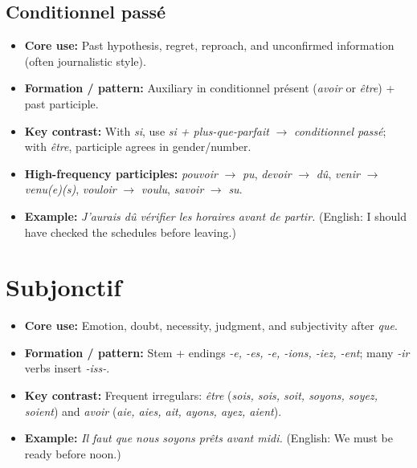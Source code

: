 \documentclass{article}
\begin{document}
\subsection{Conditionnel passé}
\begin{itemize}
    \item \textbf{Core use:} Past hypothesis, regret, reproach, and unconfirmed information (often journalistic style).
    \item \textbf{Formation / pattern:} Auxiliary in conditionnel présent (\textit{avoir} or \textit{être}) + past participle.
    \item \textbf{Key contrast:} With \textit{si}, use \textit{si + plus-que-parfait} $\to$ \textit{conditionnel passé}; with \textit{être}, participle agrees in gender/number.
    \item \textbf{High-frequency participles:} \textit{pouvoir} $\to$ \textit{pu}, \textit{devoir} $\to$ \textit{dû}, \textit{venir} $\to$ \textit{venu(e)(s)}, \textit{vouloir} $\to$ \textit{voulu}, \textit{savoir} $\to$ \textit{su}.
    \item \textbf{Example:} \textit{J'aurais dû vérifier les horaires avant de partir.} (English: I should have checked the schedules before leaving.)
\end{itemize}

\section{Subjonctif}
\begin{itemize}
    \item \textbf{Core use:} Emotion, doubt, necessity, judgment, and subjectivity after \textit{que}.
    \item \textbf{Formation / pattern:} Stem + endings \textit{-e, -es, -e, -ions, -iez, -ent}; many \textit{-ir} verbs insert \textit{-iss-}.
    \item \textbf{Key contrast:} Frequent irregulars: \textit{être} (\textit{sois, sois, soit, soyons, soyez, soient}) and \textit{avoir} (\textit{aie, aies, ait, ayons, ayez, aient}).
    \item \textbf{Example:} \textit{Il faut que nous soyons prêts avant midi.} (English: We must be ready before noon.)
\end{itemize}
\end{document}
